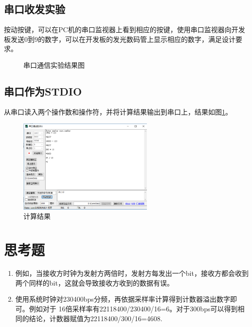 \documentclass{article}
\begin{document}
\begin{CJK}{UTF8}{gkai}
\subsection{串口收发实验}
按动按键，可以在PC机的串口监视器上看到相应的按键，使用串口监视器向开发板发送0到9的数字，可以在开发板的发光数码管上显示相应的数字，满足设计要求。
\begin{figure}
  \centering
  \caption{串口通信实验结果图}
\end{figure}
\subsection{串口作为STDIO}
从串口读入两个操作数和操作符，并将计算结果输出到串口上，结果如图\ref{pro3_1}。
\begin{figure}
  \centering
  \includegraphics[width=0.6\textwidth]{cacu.png}
  \caption{计算结果}
  \label{pro3_1}
\end{figure}
\section{思考题}
\begin{enumerate}
  \item 例如，当接收方时钟为发射方两倍时，发射方每发出一个bit，接收方都会收到两个同样的bit，这就会导致接收方收到的数据有误。
  \item 使用系统时钟对230400bps分频，再依据采样率计算得到计数器溢出数字即可。例如对于 16倍采样率有22118400/230400/16=6。对于300bps可以得到相同的结论，计数器赋值为22118400/300/16=4608.
\end{enumerate}

\end{CJK}
\end{document}
